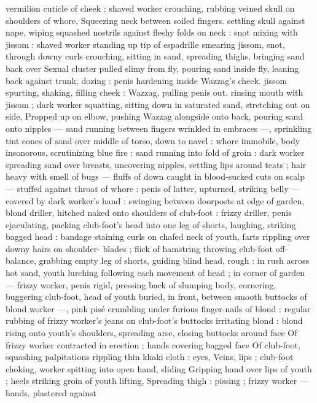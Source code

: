 vermilion cuticle of cheek ; shaved worker crouching, rubbing veined 
skull on shoulders of whore, Squeezing neck between soiled fingers. 
settling skull against nape, wiping squashed nostrils against fleshy 
folds on neck : snot mixing with jissom : shaved worker standing up 
tip of espadrille smearing jissom, snot, through downy curls 
crouching, sitting in sand, spreading thighs, bringing sand back over 
Sexual cluster pulled slimy from fly, pouring sand inside fly, leaning 
back against trunk, dozing : penis hardening inside Wazzag's cheek. 
jissom spurting, shaking, filling cheek : Wazzag, pulling penis out. 
rinsing mouth with jissom ; dark worker squatting, sitting down in 
saturated sand, stretching out on side, Propped up on elbow, 
pushing Wazzag alongside onto back, pouring sand onto nipples --- 
sand running between fingers wrinkled in embraces ---, sprinkling 
tint cones of sand over middle of torso, down to navel : whore 
immobile, body insonorous, scrutinizing blue fire : sand running into 
fold of groin : dark worker spreading sand over breasts, uncovering 
nipples, settling lips around teats ; hair heavy with smell of bugs --- 
fluffs of down caught in blood-sucked cuts on scalp --- stuffed 
against throat of whore : penis of latter, upturned, striking belly --- 
covered by dark worker's hand : swinging between doorposts at edge 
of garden, blond driller, hitched naked onto shoulders of club-foot : 
frizzy driller, penis ejaculating, packing club-foot's head into one leg 
of shorts, laughing, striking bagged head : bandage staining curls on 
chafed neck of youth, farts rippling over downy hairs on shoulder- 
blades ; flick of hamstring throwing club-foot off-balance, grabbing 
empty leg of shorts, guiding blind head, rough : in rush across hot 
sand, youth lurching following each movement of head ; in corner of 
garden --- frizzy worker, penis rigid, pressing back of slumping 
body, cornering, buggering club-foot, head of youth buried, in front, 
between smooth buttocks of blond worker ---, pink pisé crumbling 
under furious finger-nails of blond : regular rubbing of frizzy 
worker's jeans on club-foot's buttocks irritating blond : blond rising 
onto youth's shoulders, spreading arse, closing buttocks around face 
Of frizzy worker contracted in erection ; hands covering bagged face 
Of club-foot, squashing palpitations rippling thin khaki cloth : eyes, 
Veins, lips ; club-foot choking, worker spitting into open hand, sliding 
Gripping hand over lips of youth ; heels striking groin of youth lifting, 
Spreading thigh : pissing ; frizzy worker --- hands, plastered against 

